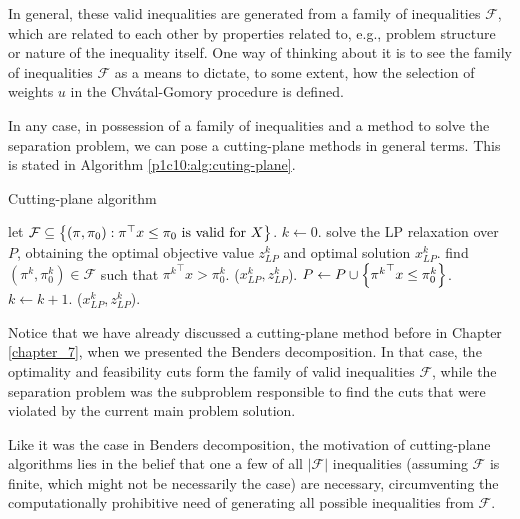In general, these valid inequalities are generated from a family of inequalities $\mathcal{F}$, which are related to each other by properties related to, e.g., problem structure or nature of the inequality itself. One way of thinking about it is to see the family of inequalities $\mathcal{F}$ as a means to dictate, to some extent, how the selection of weights $u$ in the Chv\'atal-Gomory procedure is defined.

In any case, in possession of a family of inequalities and a method to solve the separation problem, we can pose a cutting-plane methods in general terms. This is stated in Algorithm \ref{p1c10:alg:cuting-plane}.

\begin{algorithm}[h]
	\caption{Cutting-plane algorithm} \label{p1c10:alg:cuting-plane}
	\begin{algorithmic}[1] %
		 let $\mathcal{F} \subseteq \left\{ (\pi, \pi_0) : \pi^\top  x \leq \pi_0 \text{ is valid for } X \right \}$. $k \gets 0$. 
		 \label{Alg2:loop}
		    \State solve the LP relaxation over $P$, obtaining the optimal objective value $z_{LP}^k$ and optimal solution $x_{LP}^k$. 
		        find $(\pi^k, \pi^k_0) \in \mathcal{F}$ such that ${\pi^k}^\top x > \pi^k_0$. \label{Alg2:SepProb}
		    \Else 
		    	 ($x_{LP}^k, z_{LP}^k$).
		    \EndIf
		    \State $P \gets P \cup \left\{ {\pi^k}^\top x \leq \pi^k_0 \right \}$. $k \gets k+1$.
		\EndWhile
	     ($x_{LP}^k, z_{LP}^k$).
	\end{algorithmic}
\end{algorithm}

Notice that we have already discussed a cutting-plane method before in Chapter \ref{chapter_7}, when we presented the Benders decomposition. In that case, the optimality and feasibility cuts form the family of valid inequalities $\mathcal{F}$, while the separation problem was the subproblem responsible to find the cuts that were violated by the current main problem solution. 

Like it was the case in Benders decomposition, the motivation of cutting-plane algorithms lies in the belief that one a few of all $|\mathcal{F}|$ inequalities (assuming $\mathcal{F}$ is finite, which might not be necessarily the case) are necessary, circumventing the computationally prohibitive need of generating all possible inequalities from $\mathcal{F}$.

